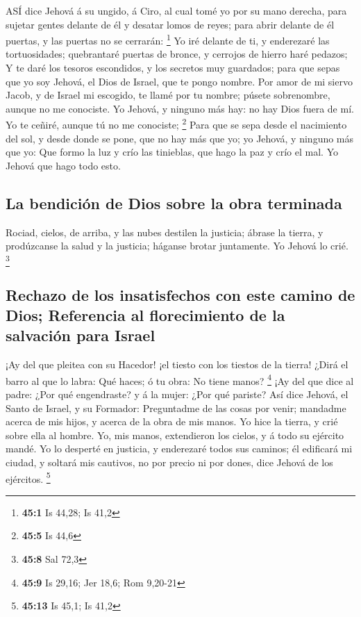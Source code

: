  ASÍ dice Jehová á su ungido, á Ciro, al cual tomé yo por su
mano derecha, para sujetar gentes delante de él y desatar lomos de
reyes; para abrir delante de él puertas, y las puertas no se cerrarán:
\footnote{\textbf{45:1} Is 44,28; Is 41,2}  Yo iré delante
de ti, y enderezaré las tortuosidades; quebrantaré puertas de bronce, y
cerrojos de hierro haré pedazos;  Y te daré los tesoros
escondidos, y los secretos muy guardados; para que sepas que yo soy
Jehová, el Dios de Israel, que te pongo nombre.  Por amor de
mi siervo Jacob, y de Israel mi escogido, te llamé por tu nombre; púsete
sobrenombre, aunque no me conociste.  Yo Jehová, y ninguno
más hay: no hay Dios fuera de mí. Yo te ceñiré, aunque tú no me
conociste; \footnote{\textbf{45:5} Is 44,6}  Para que se
sepa desde el nacimiento del sol, y desde donde se pone, que no hay más
que yo; yo Jehová, y ninguno más que yo:  Que formo la luz y
crío las tinieblas, que hago la paz y crío el mal. Yo Jehová que hago
todo esto.

\hypertarget{la-bendiciuxf3n-de-dios-sobre-la-obra-terminada}{%
\subsection{La bendición de Dios sobre la obra
terminada}\label{la-bendiciuxf3n-de-dios-sobre-la-obra-terminada}}

 Rociad, cielos, de arriba, y las nubes destilen la
justicia; ábrase la tierra, y prodúzcanse la salud y la justicia;
háganse brotar juntamente. Yo Jehová lo crié. \footnote{\textbf{45:8}
  Sal 72,3}

\hypertarget{rechazo-de-los-insatisfechos-con-este-camino-de-dios-referencia-al-florecimiento-de-la-salvaciuxf3n-para-israel}{%
\subsection{Rechazo de los insatisfechos con este camino de Dios;
Referencia al florecimiento de la salvación para
Israel}\label{rechazo-de-los-insatisfechos-con-este-camino-de-dios-referencia-al-florecimiento-de-la-salvaciuxf3n-para-israel}}

 ¡Ay del que pleitea con su Hacedor! ¡el tiesto con los
tiestos de la tierra! ¿Dirá el barro al que lo labra: Qué haces; ó tu
obra: No tiene manos? \footnote{\textbf{45:9} Is 29,16; Jer 18,6; Rom
  9,20-21}  ¡Ay del que dice al padre: ¿Por qué
engendraste? y á la mujer: ¿Por qué pariste?  Así dice
Jehová, el Santo de Israel, y su Formador: Preguntadme de las cosas por
venir; mandadme acerca de mis hijos, y acerca de la obra de mis manos.
 Yo hice la tierra, y crié sobre ella al hombre. Yo, mis
manos, extendieron los cielos, y á todo su ejército mandé. 
Yo lo desperté en justicia, y enderezaré todos sus caminos; él edificará
mi ciudad, y soltará mis cautivos, no por precio ni por dones, dice
Jehová de los ejércitos. \footnote{\textbf{45:13} Is 45,1; Is 41,2}


